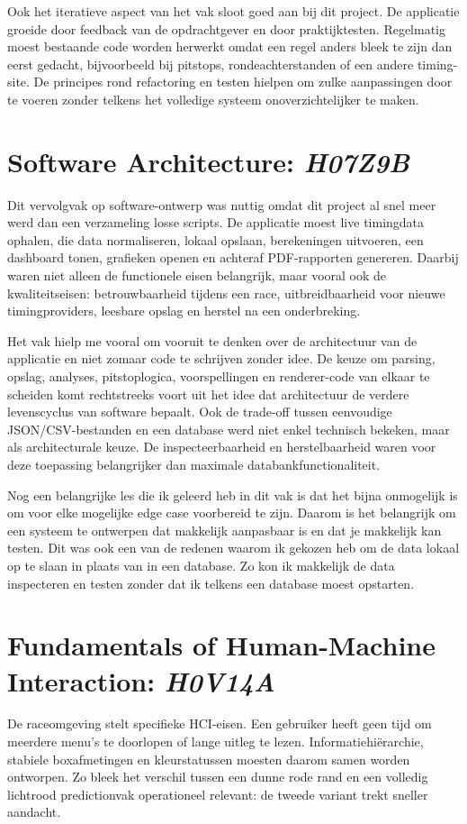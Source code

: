 Ook het iteratieve aspect van het vak sloot goed aan bij dit project. De applicatie groeide door
feedback van de opdrachtgever en door praktijktesten. Regelmatig moest bestaande code worden
herwerkt omdat een regel anders bleek te zijn dan eerst gedacht, bijvoorbeeld bij pitstops,
rondeachterstanden of een andere timing-site. De principes rond refactoring en testen hielpen om zulke aanpassingen
door te voeren zonder telkens het volledige systeem onoverzichtelijker te maken.


\section{Software Architecture: \emph{H07Z9B}}
Dit vervolgvak op software-ontwerp was nuttig omdat dit project al snel meer werd dan een verzameling losse
scripts. De applicatie moest live timingdata ophalen, die data normaliseren, lokaal opslaan,
berekeningen uitvoeren, een dashboard tonen, grafieken openen en achteraf PDF-rapporten genereren.
Daarbij waren niet alleen de functionele eisen belangrijk, maar vooral ook de kwaliteitseisen:
betrouwbaarheid tijdens een race, uitbreidbaarheid voor nieuwe timingproviders, leesbare opslag en
herstel na een onderbreking.

Het vak hielp me vooral om vooruit te denken over de architectuur van de applicatie en niet zomaar code te schrijven zonder idee. De keuze om parsing, opslag, analyses, pitstoplogica, voorspellingen en renderer-code van elkaar te scheiden
komt rechtstreeks voort uit het idee dat architectuur de verdere levenscyclus van software bepaalt.
Ook de trade-off tussen eenvoudige JSON/CSV-bestanden en een database werd niet enkel technisch
bekeken, maar als architecturale keuze. De inspecteerbaarheid en herstelbaarheid waren voor deze
toepassing belangrijker dan maximale databankfunctionaliteit.

Nog een belangrijke les die ik geleerd heb in dit vak is dat het bijna onmogelijk is om voor elke mogelijke edge case voorbereid te zijn. Daarom is het belangrijk om een systeem te ontwerpen dat makkelijk aanpasbaar is en dat je makkelijk kan testen. Dit was ook een van de redenen waarom ik gekozen heb om de data lokaal op te slaan in plaats van in een database. Zo kon ik makkelijk de data inspecteren en testen zonder dat ik telkens een database moest opstarten.


\section{Fundamentals of Human-Machine Interaction: \emph{H0V14A}}
De raceomgeving stelt specifieke HCI-eisen. Een gebruiker heeft geen tijd om meerdere menu's
te doorlopen of lange uitleg te lezen. Informatiehiërarchie, stabiele boxafmetingen en
kleurstatussen moesten daarom samen worden ontworpen. Zo bleek het verschil tussen een dunne rode rand en een
volledig lichtrood predictionvak operationeel relevant: de tweede variant trekt sneller
aandacht.

